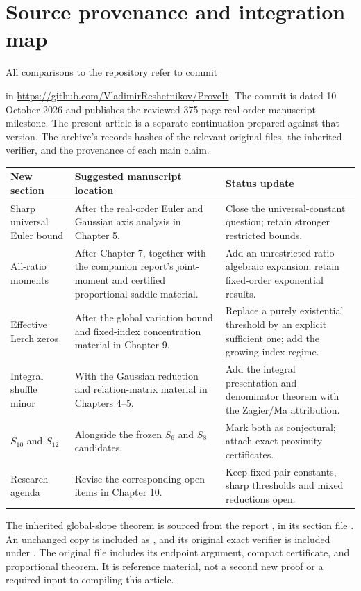 \appendix
\section{Source provenance and integration map}
\label{app:provenance}

All comparisons to the repository refer to commit
\begin{center}\sourcecommit\end{center}
in \url{https://github.com/VladimirReshetnikov/ProveIt}.
The commit is dated 10 October 2026 and publishes the reviewed
375-page real-order manuscript milestone. The present article is a
separate continuation prepared against that version. The archive's
 records hashes of the relevant original files,
the inherited verifier, and the provenance of each main claim.

\begin{longtable}{@{}P{0.28\textwidth}P{0.40\textwidth}P{0.26\textwidth}@{}}
\toprule
New section & Suggested manuscript location & Status update\\
\midrule
\endhead
Sharp universal Euler bound & After the real-order Euler and Gaussian
axis analysis in Chapter 5. & Close the universal-constant question;
retain stronger restricted bounds.\\
All-ratio moments & After Chapter 7, together with the companion report's joint-moment and
certified proportional saddle material. & Add an unrestricted-ratio algebraic
expansion; retain fixed-order exponential results.\\
Effective Lerch zeros & After the global variation bound and fixed-index
concentration material in Chapter 9. & Replace a purely existential
threshold by an explicit sufficient one; add the growing-index regime.\\
Integral shuffle minor & With the Gaussian reduction and relation-matrix
material in Chapters 4--5. & Add the integral presentation and denominator
theorem with the Zagier/Ma attribution.\\
$S_{10}$ and $S_{12}$ & Alongside the frozen $S_6$ and $S_8$ candidates. &
Mark both as conjectural; attach exact proximity certificates.\\
Research agenda & Revise the corresponding open items in Chapter 10. &
Keep fixed-pair constants, sharp thresholds and mixed reductions open.\\
\bottomrule
\end{longtable}

The inherited global-slope theorem is sourced from the report
, in its section file
.
An unchanged copy is included as ,
and its original exact verifier is included under .
The original file includes its endpoint argument, compact certificate,
and proportional theorem. It is reference material, not a second new
proof or a required input to compiling this article.

